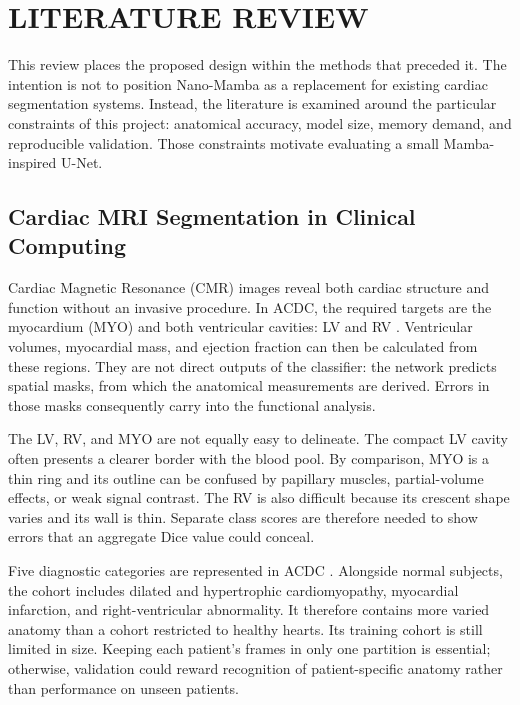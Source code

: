 
\chapter{LITERATURE REVIEW}
\label{chap:litreview}

This review places the proposed design within the methods that preceded it. The intention is not to position Nano-Mamba as a replacement for existing cardiac segmentation systems. Instead, the literature is examined around the particular constraints of this project: anatomical accuracy, model size, memory demand, and reproducible validation. Those constraints motivate evaluating a small Mamba-inspired U-Net.

\section{Cardiac MRI Segmentation in Clinical Computing}
Cardiac Magnetic Resonance (CMR) images reveal both cardiac structure and function without an invasive procedure. In ACDC, the required targets are the myocardium (MYO) and both ventricular cavities: LV and RV \citep{bernard2018deep}. Ventricular volumes, myocardial mass, and ejection fraction can then be calculated from these regions. They are not direct outputs of the classifier: the network predicts spatial masks, from which the anatomical measurements are derived. Errors in those masks consequently carry into the functional analysis.

The LV, RV, and MYO are not equally easy to delineate. The compact LV cavity often presents a clearer border with the blood pool. By comparison, MYO is a thin ring and its outline can be confused by papillary muscles, partial-volume effects, or weak signal contrast. The RV is also difficult because its crescent shape varies and its wall is thin. Separate class scores are therefore needed to show errors that an aggregate Dice value could conceal.

Five diagnostic categories are represented in ACDC \citep{bernard2018deep}. Alongside normal subjects, the cohort includes dilated and hypertrophic cardiomyopathy, myocardial infarction, and right-ventricular abnormality. It therefore contains more varied anatomy than a cohort restricted to healthy hearts. Its training cohort is still limited in size. Keeping each patient's frames in only one partition is essential; otherwise, validation could reward recognition of patient-specific anatomy rather than performance on unseen patients.


